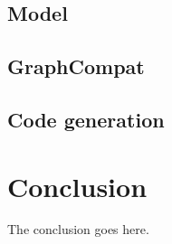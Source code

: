 \documentclass[journal]{IEEEtran}
\begin{document}
\subsection{Model}



\subsection{GraphCompat}



\subsection{Code generation}




\section{Conclusion}
\noindent The conclusion goes here.
\end{document}
